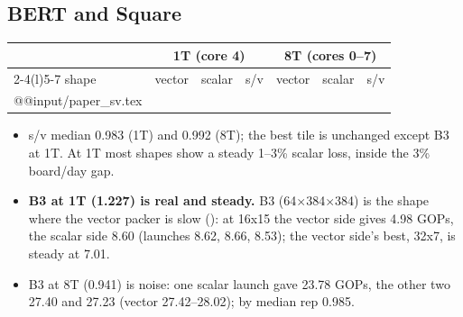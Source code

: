 \subsection{BERT and Square}\label{sec:paperpack}
\begin{center}\small
\begin{tabular}{@{}l llr llr@{}}
\toprule
 & \multicolumn{3}{c}{1T (core 4)} & \multicolumn{3}{c}{8T (cores 0--7)} \\
\cmidrule(lr){2-4}\cmidrule(l){5-7}
shape & vector & scalar & s/v & vector & scalar & s/v \\
\midrule
\csname @@input\endcsname \D/paper_sv.tex
\bottomrule
\end{tabular}
\end{center}
\begin{itemize}\setlength\itemsep{1pt}
\item s/v median 0.983 (1T) and 0.992 (8T); the best tile is unchanged except B3 at 1T. At 1T most shapes show a steady 1--3\% scalar loss, inside the 3\% board/day gap.
\item \textbf{B3 at 1T (1.227) is real and steady.} B3 (64$\times$384$\times$384) is the shape where the vector packer is slow (): at 16x15 the vector side gives 4.98 GOPs, the scalar side 8.60 (launches 8.62, 8.66, 8.53); the vector side's best, 32x7, is steady at 7.01.
\item B3 at 8T (0.941) is noise: one scalar launch gave 23.78 GOPs, the other two 27.40 and 27.23 (vector 27.42--28.02); by median rep 0.985.
\end{itemize}

